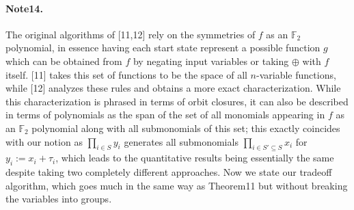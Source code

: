 \paragraph{Note14.} The original algorithms of [11,12] rely on the symmetries of $f$ as an $\mathbb F_2$ polynomial, in essence having each start state represent a possible function $g$ which can be obtained from $f$ by negating input variables or taking $\oplus$ with $f$ itself. [11] takes this set of functions to be the space of all $n$-variable functions, while [12] analyzes these rules and obtains a more exact characterization. While this characterization is phrased in terms of orbit closures, it can also be described in terms of polynomials as the span of the set of all monomials appearing in $f$ as an $\mathbb F_2$ polynomial along with all submonomials of this set; this exactly coincides with our notion as $\prod_{i\in S}y_i$ generates all submonomials $\prod_{i\in S'\subseteq S}x_i$ for $y_i:=x_i+\tau_i$, which leads to the quantitative results being essentially the same despite taking two completely different approaches.
Now we state our tradeoff algorithm, which goes much in the same way as Theorem11 but without breaking the variables into groups.
